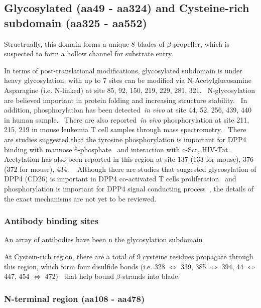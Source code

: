\subsection{Glycosylated (aa49 - aa324) and Cysteine-rich subdomain (aa325 - aa552)}

Structrually, this domain forms a unique 8 blades of $\beta$-propeller, which is suspected to form a hollow channel for substrate entry.

In terms of post-translational modifications, glycosylated subdomain is under heavy glycosylation, with up to 7 sites can be modified via N-Acetylglucosamine Asparagine (i.e. N-linked) at site 85, 92, 150, 219, 229, 281, 321.~\cite{Rasmussen2003,Thoma2003,Meng2010,Chen2009,Hiramatsu2003} N-glycosylation are believed important in protein folding and increasing structure stability.~\cite{Fan_1997} In addition, phosphorylation has been detected~\textit{in vivo} at site 44, 52, 256, 439, 440 in human sample.~\cite{Xia2008, Hornbeck2015, Mertins2014} There are also reported~\textit{in vivo} phosphorylation at site 211, 215, 219 in mouse leukemia T cell samples through mass spectrometry.~\cite{Hornbeck2015} There are studies suggested that the tyrosine phosphorylation is important for DPP4 binding with mannose 6-phosphate~\cite{Ikushima_2000} and interaction with c-Scr, HIV-Tat.~\cite{Bilodeau_2006,Fan_2012}
Acetylation has also been reported in this region at site 137 (133 for mouse), 376 (372 for mouse), 434. ~\cite{Lundby2012,Weinert2013} Although there are studies that suggested glycosylation of DPP4 (CD26) is important in DPP4 co-activated T cells proliferation~\cite{Ikushima_2000} and phosphorylation is important for DPP4 signal conducting process~\cite{Ishii_2001}, the details of the exact mechanisms are not yet to be reviewed.
\par
\subsubsection{Antibody binding sites}
An array of antibodies have been n the glycosylation subdomain ~\cite{Hegen1997,Gaetaniello1998}
\par

At Cystein-rich region, there are a total of 9 cysteine residues propagate through this region, which form four disulfide bonds (i.e. 328 $\Leftrightarrow$ 339, 385 $\Leftrightarrow$ 394, 44 $\Leftrightarrow$ 447, 454 $\Leftrightarrow$ 472)~\cite{Hiramatsu2003} that help bound $\beta$-strands into blade. 

\subsubsection{N-terminal region (aa108 - aa478)}

